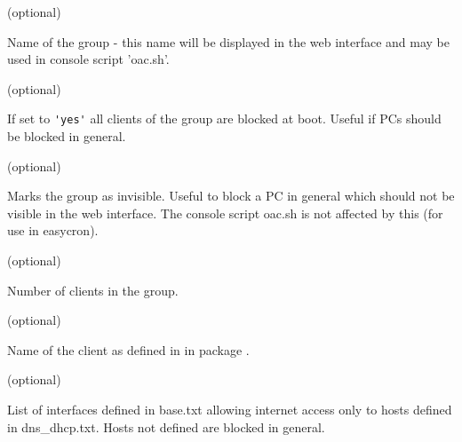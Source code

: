 \begin{description}
 (optional)

    Name of the group - this name will be displayed in the web interface and may be 
    used in console script 'oac.sh'.

 (optional)

    If set to \verb*?'yes'? all clients of the group are blocked at boot. Useful if 
    PCs should be blocked in general.

 (optional)

    Marks the group as invisible. Useful to block a PC in general which should 
    not be visible in the web interface. The console script oac.sh is not affected 
    by this (for use in easycron).

 (optional)

    Number of clients in the group.

 (optional)

    Name of the client as defined in {} in package .

 (optional)

    List of interfaces defined in base.txt allowing internet access only to 
    hosts defined in dns\_dhcp.txt. Hosts not defined are blocked in general.

\end{description}

